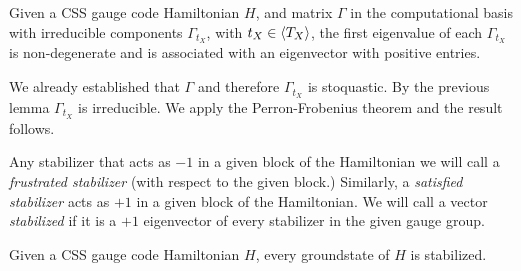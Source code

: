 
Given a CSS gauge code Hamiltonian $H$, 
and matrix $\Gamma$ in the computational basis 
with irreducible
components $\Gamma_{t_X}$,
with $t_X\in\langle T_X \rangle$,
the first eigenvalue 
of each $\Gamma_{t_X}$
is non-degenerate
and is associated with an eigenvector 
with positive entries.

\doproof
We already established that $\Gamma$ and therefore
$\Gamma_{t_X}$ is stoquastic.
By the previous lemma $\Gamma_{t_X}$ is irreducible.
We apply the Perron-Frobenius theorem and the result follows.
\tombstone

Any stabilizer that acts as $-1$ in a given block of
the Hamiltonian we will call a \emph{frustrated stabilizer}
(with respect to the given block.)
Similarly, a \emph{satisfied stabilizer} acts as $+1$ in a given
block of the Hamiltonian.
We will call a
vector \emph{stabilized} if it is a $+1$ eigenvector 
of every stabilizer in the given gauge group.

Given a CSS gauge code Hamiltonian $H$,
every groundstate of $H$ is stabilized.

